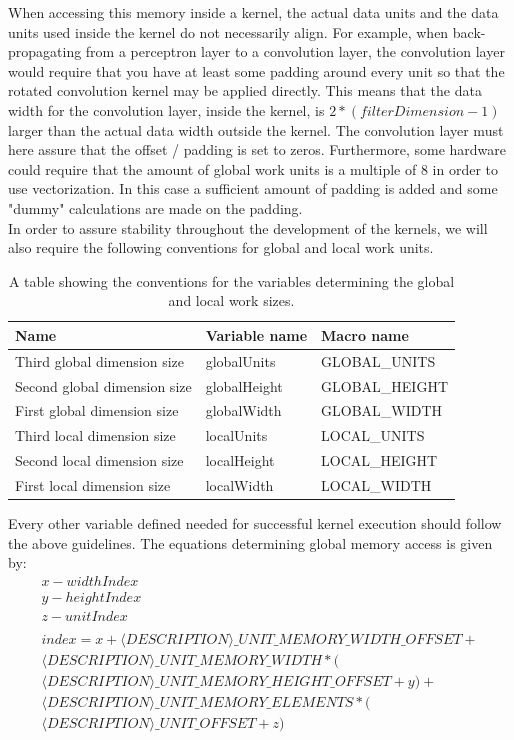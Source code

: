 \documentclass[a4paper,10pt]{article}
\begin{document}
When accessing this memory inside a kernel, the actual data units and the data units used inside the kernel do not necessarily align. For example, when back-propagating from a perceptron layer to a convolution layer, the convolution layer would require that you have at least some padding around every unit so that the rotated convolution kernel may be applied directly. This means that the data width for the convolution layer, inside the kernel, is $2 * (filterDimension - 1)$ larger than the actual data width outside the kernel. The convolution layer must here assure that the offset / padding is set to zeros. Furthermore, some hardware could require that the amount of global work units is a multiple of 8 in order to use vectorization. In this case a sufficient amount of padding is added and some "dummy" calculations are made on the padding. \\

In order to assure stability throughout the development of the kernels, we will also require the following conventions for global and local work units. 

\begin{table}[H]
	\centering
	\normalsize
	\begin{tabular}{|l | l| l|}
		\hline
		\textbf{Name} & \textbf{Variable name} & \textbf{Macro name} \\
		\hline
		Third global dimension size & globalUnits & GLOBAL\_UNITS \\
		\hline
		Second global dimension size & globalHeight & GLOBAL\_HEIGHT \\
		\hline
		First global dimension size & globalWidth & GLOBAL\_WIDTH \\
		\hline
		Third local dimension size & localUnits & LOCAL\_UNITS \\
		\hline
		Second local dimension size & localHeight & LOCAL\_HEIGHT \\
		\hline
		First local dimension size & localWidth & LOCAL\_WIDTH \\
		\hline
	\end{tabular}
	\caption{A table showing the conventions for the variables determining the global and local work sizes.}
\end{table}

Every other variable defined needed for successful kernel execution should follow the above guidelines. The equations determining global memory access is given by:
\begin{gather*}
x - widthIndex\\
y - heightIndex\\
z - unitIndex\\ \\
index = x + \langle DESCRIPTION\rangle\_UNIT\_MEMORY\_WIDTH\_OFFSET + \\
\langle DESCRIPTION\rangle\_UNIT\_MEMORY\_WIDTH * ( \\
 \langle DESCRIPTION\rangle\_UNIT\_MEMORY\_HEIGHT\_OFFSET + y) + \\
  \langle DESCRIPTION\rangle\_UNIT\_MEMORY\_ELEMENTS *( \\
  \langle DESCRIPTION\rangle\_UNIT\_OFFSET + z)
\end{gather*}
\end{document}
